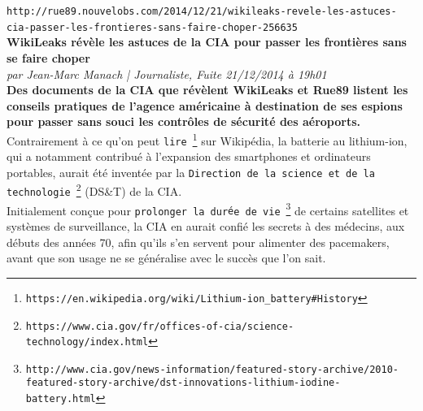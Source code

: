 \documentclass[11pt,twoside,a4paper]{article}
\begin{document}
\setlength\parindent{0pt}

\texttt{http://rue89.nouvelobs.com/2014/12/21/wikileaks-revele-les-astuces-cia-passer-les-frontieres-sans-faire-choper-256635}~\\

\textbf{\LARGE WikiLeaks r{\'e}v{\`e}le les astuces de la CIA pour passer les fronti{\`e}res sans se faire choper} ~\\

\emph{\small par Jean-Marc Manach | Journaliste, Fuite 21/12/2014 {\`a} 19h01} ~\\

\textbf{Des documents de la CIA que r{\'e}v{\`e}lent WikiLeaks et Rue89 listent les conseils pratiques de l'agence am{\'e}ricaine {\`a} destination de ses espions pour passer sans souci les contr{\^o}les de s{\'e}curit{\'e} des a{\'e}roports. } ~\\



Contrairement {\`a} ce qu'on peut \texttt{lire}~\footnote{\texttt{https://en.wikipedia.org/wiki/Lithium-ion\_battery\#History}} sur Wikip{\'e}dia, la batterie au lithium-ion, qui a notamment contribu{\'e} {\`a} l'expansion des smartphones et ordinateurs portables, aurait {\'e}t{\'e} invent{\'e}e par la \texttt{Direction de la science et de la technologie}~\footnote{\texttt{https://www.cia.gov/fr/offices-of-cia/science-technology/index.html}} (DS\&T) de la CIA. ~\\

Initialement con\c{c}ue pour \texttt{prolonger la dur{\'e}e de vie}~\footnote{\texttt{http://www.cia.gov/news-information/featured-story-archive/2010-featured-story-archive/dst-innovations-lithium-iodine-battery.html}} de certains satellites et syst{\`e}mes de surveillance, la CIA en aurait confi{\'e} les secrets {\`a} des m{\'e}decins, aux d{\'e}buts des ann{\'e}es 70, afin qu'ils s'en servent pour alimenter des pacemakers, avant que son usage ne se g{\'e}n{\'e}ralise avec le succ{\`e}s que l'on sait. ~\\
\end{document}
